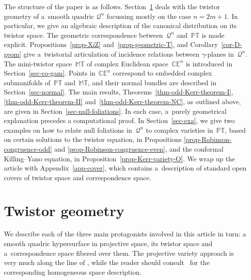 \documentclass[pdftex]{sigma}
\numberwithin{equation}{section}
\newcommand{\mc} [1]{\mathcal{#1}}
\newcommand{\PT} {\mathbb{PT}}
\newcommand{\T} {\mathbb{T}}
\newcommand{\E} {\mathbb{E}}
\newcommand{\M} {\mathbb{M}}
\newcommand{\C} {\mathbb{C}}
\begin{document}
The structure of the paper is as follows. Section~\ref{sec-geo-bkgd} deals with the twistor geometry of a~smooth quadric $\mc{Q}^n$ focussing mostly on the case $n=2m+1$. In particular, we give an algebraic description of the canonical distribution on its twistor space. The geometric correspondence bet\-ween~$\mc{Q}^n$ and~$\PT$ is made explicit. Propositions~\ref{prop-XiZ} and~\ref{prop-geometric-T}, and Corollary~\ref{cor-D-geom} give a~twistorial articulation of incidence relations between $\gamma$-planes in~$\mc{Q}^n$. The mini-twistor space~$\M\T$ of complex Euclidean space~$\C \E^n$ is introduced in Section~\ref{sec-co-gam}. Points in~$\C \E^n$ correspond to embedded complex submanifolds of~$\PT$ and~$\M\T$, and their normal bundles are described in Section~\ref{sec-normal}. The main results, Theorems~\ref{thm-odd-Kerr-theorem-I}, \ref{thm-odd-Kerr-theorem-II} and~\ref{thm-odd-Kerr-theorem-NC}, as outlined above, are given in Section~\ref{sec-null-foliations}. In each case, a~purely geometrical explanation precedes a computational proof. In Section~\ref{sec-exa}, we give two examples on how to relate null foliations in~$\mc{Q}^n$ to complex varieties in~$\PT$, based on certain solutions to the twistor equation, in Propositions \ref{prop-Robinson-congruence-odd} and \ref{prop-Robinson-congruence-even}, and the conformal Killing--Yano equation, in Proposition~\ref{prop-Kerr-variety-O}. We wrap up the article with Appendix~\ref{app-cover}, which contains a~description of standard open covers of twistor space and correspondence space.

\section{Twistor geometry}\label{sec-geo-bkgd}
We describe each of the three main protagonists involved in this article in turn: a smooth quadric hypersurface in projective space, its twistor space and a~correspondence space f\/ibered over them. The projective variety approach is very much along the line of \cite{Hughston1983, Penrose1986}, while the reader should consult~\cite{Baston1989,vCap2009} for the corresponding homogeneous space description.
\end{document}
